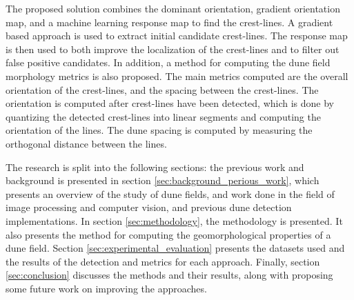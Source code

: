 The proposed solution combines the dominant orientation, gradient orientation map, and a machine learning response map to find the crest-lines. A gradient based approach is used to extract initial candidate crest-lines. The response map is then used to both improve the localization of the crest-lines and to filter out false positive candidates. In addition, a method for computing the dune field morphology metrics is also proposed. The main metrics computed are the overall orientation of the crest-lines, and the spacing between the crest-lines. The orientation is computed after crest-lines have been detected, which is done by quantizing the detected crest-lines into linear segments and computing the orientation of the lines. The dune spacing is computed by measuring the orthogonal distance between the lines.

The research is split into the following sections: the previous work and background is presented in section \ref{sec:background_perious_work}, which presents an overview of the study of dune fields, and work done in the field of image processing and computer vision, and previous dune detection implementations. In section \ref{sec:methodology}, the methodology is presented. It also presents the method for computing the geomorphological properties of a dune field. Section \ref{sec:experimental_evaluation} presents the  datasets used and the results of the detection and metrics for each approach. Finally, section \ref{sec:conclusion} discusses the methods and their results, along with proposing some future work on improving the approaches. 